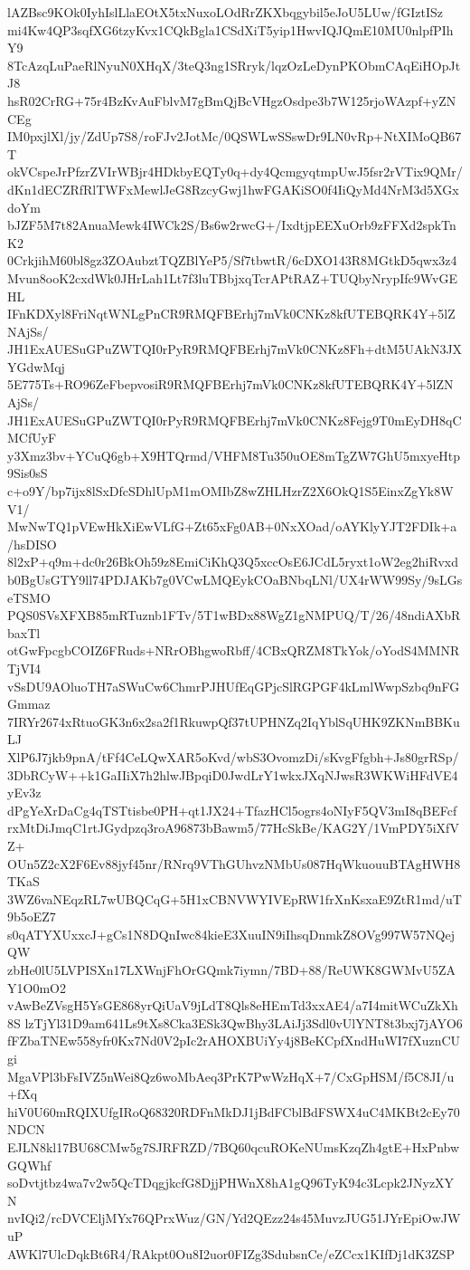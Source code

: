 lAZBsc9KOk0IyhIslLlaEOtX5txNuxoLOdRrZKXbqgybil5eJoU5LUw/fGIztISz
mi4Kw4QP3sqfXG6tzyKvx1CQkBgla1CSdXiT5yip1HwvIQJQmE10MU0nlpfPIhY9
8TcAzqLuPaeRlNyuN0XHqX/3teQ3ng1SRryk/lqzOzLeDynPKObmCAqEiHOpJtJ8
hsR02CrRG+75r4BzKvAuFblvM7gBmQjBcVHgzOsdpe3b7W125rjoWAzpf+yZNCEg
IM0pxjlXl/jy/ZdUp7S8/roFJv2JotMc/0QSWLwSSswDr9LN0vRp+NtXIMoQB67T
okVCspeJrPfzrZVIrWBjr4HDkbyEQTy0q+dy4QcmgyqtmpUwJ5fsr2rVTix9QMr/
dKn1dECZRfRlTWFxMewlJeG8RzcyGwj1hwFGAKiSO0f4IiQyMd4NrM3d5XGxdoYm
bJZF5M7t82AnuaMewk4IWCk2S/Bs6w2rwcG+/IxdtjpEEXuOrb9zFFXd2spkTnK2
0CrkjihM60bl8gz3ZOAubztTQZBlYeP5/Sf7tbwtR/6cDXO143R8MGtkD5qwx3z4
Mvun8ooK2cxdWk0JHrLah1Lt7f3luTBbjxqTcrAPtRAZ+TUQbyNrypIfc9WvGEHL
IFnKDXyl8FriNqtWNLgPnCR9RMQFBErhj7mVk0CNKz8kfUTEBQRK4Y+5lZNAjSs/
JH1ExAUESuGPuZWTQI0rPyR9RMQFBErhj7mVk0CNKz8Fh+dtM5UAkN3JXYGdwMqj
5E775Ts+RO96ZeFbepvosiR9RMQFBErhj7mVk0CNKz8kfUTEBQRK4Y+5lZNAjSs/
JH1ExAUESuGPuZWTQI0rPyR9RMQFBErhj7mVk0CNKz8Fejg9T0mEyDH8qCMCfUyF
y3Xmz3bv+YCuQ6gb+X9HTQrmd/VHFM8Tu350uOE8mTgZW7GhU5mxyeHtp9Sis0sS
c+o9Y/bp7ijx8lSxDfcSDhlUpM1mOMIbZ8wZHLHzrZ2X6OkQ1S5EinxZgYk8WV1/
MwNwTQ1pVEwHkXiEwVLfG+Zt65xFg0AB+0NxXOad/oAYKlyYJT2FDIk+a/hsDISO
8l2xP+q9m+dc0r26BkOh59z8EmiCiKhQ3Q5xccOsE6JCdL5ryxt1oW2eg2hiRvxd
b0BgUsGTY9ll74PDJAKb7g0VCwLMQEykCOaBNbqLNl/UX4rWW99Sy/9sLGseTSMO
PQS0SVsXFXB85mRTuznb1FTv/5T1wBDx88WgZ1gNMPUQ/T/26/48ndiAXbRbaxTl
otGwFpcgbCOIZ6FRuds+NRrOBhgwoRbff/4CBxQRZM8TkYok/oYodS4MMNRTjVI4
vSsDU9AOluoTH7aSWuCw6ChmrPJHUfEqGPjcSlRGPGF4kLmlWwpSzbq9nFGGmmaz
7IRYr2674xRtuoGK3n6x2sa2f1RkuwpQf37tUPHNZq2IqYblSqUHK9ZKNmBBKuLJ
XlP6J7jkb9pnA/tFf4CeLQwXAR5oKvd/wbS3OvomzDi/sKvgFfgbh+Js80grRSp/
3DbRCyW++k1GaIIiX7h2hlwJBpqiD0JwdLrY1wkxJXqNJwsR3WKWiHFdVE4yEv3z
dPgYeXrDaCg4qTSTtisbe0PH+qt1JX24+TfazHCl5ogrs4oNIyF5QV3mI8qBEFcf
rxMtDiJmqC1rtJGydpzq3roA96873bBawm5/77HcSkBe/KAG2Y/1VmPDY5iXfVZ+
OUn5Z2cX2F6Ev88jyf45nr/RNrq9VThGUhvzNMbUs087HqWkuouuBTAgHWH8TKaS
3WZ6vaNEqzRL7wUBQCqG+5H1xCBNVWYIVEpRW1frXnKsxaE9ZtR1md/uT9b5oEZ7
s0qATYXUxxcJ+gCs1N8DQnIwc84kieE3XuuIN9iIhsqDnmkZ8OVg997W57NQejQW
zbHe0lU5LVPISXn17LXWnjFhOrGQmk7iymn/7BD+88/ReUWK8GWMvU5ZAY1O0mO2
vAwBeZVsgH5YsGE868yrQiUaV9jLdT8Qls8eHEmTd3xxAE4/a7I4mitWCuZkXh8S
lzTjYl31D9am641Ls9tXs8Cka3ESk3QwBhy3LAiJj3Sdl0vUlYNT8t3bxj7jAYO6
fFZbaTNEw558yfr0Kx7Nd0V2pIc2rAHOXBUiYy4j8BeKCpfXndHuWI7fXuznCUgi
MgaVPl3bFsIVZ5nWei8Qz6woMbAeq3PrK7PwWzHqX+7/CxGpHSM/f5C8JI/u+fXq
hiV0U60mRQIXUfgIRoQ68320RDFnMkDJ1jBdFCblBdFSWX4uC4MKBt2cEy70NDCN
EJLN8kl17BU68CMw5g7SJRFRZD/7BQ60qcuROKeNUmsKzqZh4gtE+HxPnbwGQWhf
soDvtjtbz4wa7v2w5QcTDqgjkcfG8DjjPHWnX8hA1gQ96TyK94c3Lcpk2JNyzXYN
nvIQi2/rcDVCEljMYx76QPrxWuz/GN/Yd2QEzz24s45MuvzJUG51JYrEpiOwJWuP
AWKl7UlcDqkBt6R4/RAkpt0Ou8I2uor0FIZg3SdubsnCe/eZCcx1KIfDj1dK3ZSP
